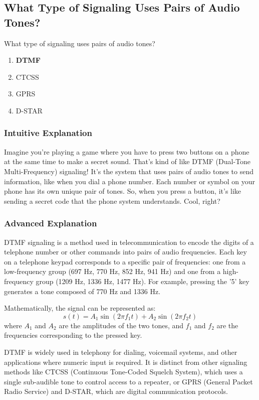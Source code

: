 \subsection{What Type of Signaling Uses Pairs of Audio Tones?}
\label{T2B06}

\begin{tcolorbox}[colback=gray!10!white,colframe=black!75!black,title=T2B06]
What type of signaling uses pairs of audio tones?
\begin{enumerate}[label=\Alph*)]
    \item \textbf{DTMF}
    \item CTCSS
    \item GPRS
    \item D-STAR
\end{enumerate}
\end{tcolorbox}

\subsubsection{Intuitive Explanation}
Imagine you’re playing a game where you have to press two buttons on a phone at the same time to make a secret sound. That’s kind of like DTMF (Dual-Tone Multi-Frequency) signaling! It’s the system that uses pairs of audio tones to send information, like when you dial a phone number. Each number or symbol on your phone has its own unique pair of tones. So, when you press a button, it’s like sending a secret code that the phone system understands. Cool, right?

\subsubsection{Advanced Explanation}
DTMF signaling is a method used in telecommunication to encode the digits of a telephone number or other commands into pairs of audio frequencies. Each key on a telephone keypad corresponds to a specific pair of frequencies: one from a low-frequency group (697 Hz, 770 Hz, 852 Hz, 941 Hz) and one from a high-frequency group (1209 Hz, 1336 Hz, 1477 Hz). For example, pressing the '5' key generates a tone composed of 770 Hz and 1336 Hz.

Mathematically, the signal can be represented as:
\[
s(t) = A_1 \sin(2\pi f_1 t) + A_2 \sin(2\pi f_2 t)
\]
where \( A_1 \) and \( A_2 \) are the amplitudes of the two tones, and \( f_1 \) and \( f_2 \) are the frequencies corresponding to the pressed key.

DTMF is widely used in telephony for dialing, voicemail systems, and other applications where numeric input is required. It is distinct from other signaling methods like CTCSS (Continuous Tone-Coded Squelch System), which uses a single sub-audible tone to control access to a repeater, or GPRS (General Packet Radio Service) and D-STAR, which are digital communication protocols.

